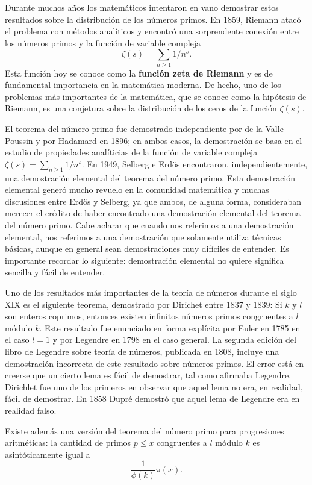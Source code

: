 Durante muchos años los matemáticos intentaron en vano demostrar estos
resultados sobre la distribución de los números primos.  En 1859, Riemann atacó
el problema con métodos analíticos y encontró una sorprendente conexión entre
los números primos y la función de variable compleja 
\[
\zeta(s)=\sum_{n\geq1}1/n^{s}. 
\]
Esta función hoy se conoce como la \textbf{función zeta de Riemann} y es de
fundamental importancia en la matemática moderna. De hecho, uno de los
problemas más importantes de la matemática, que se conoce como la hipótesis de
Riemann, es una conjetura sobre la distribución de los ceros de la función
$\zeta(s)$. 

El teorema del número primo fue demostrado independiente por de la Valle
Poussin y por Hadamard en 1896; en ambos casos, la demostración se basa en el
estudio de propiedades analíticias de la función de variable compleja
$\zeta(s)=\sum_{n\geq1}1/n^{s}$. En 1949, Selberg e Erd\"os encontraron,
independientemente, una demostración elemental del teorema del número primo.
Esta demostración elemental generó mucho revuelo en la comunidad matemática y
muchas discusiones entre Erd\"os y Selberg, ya que ambos, de alguna forma,
consideraban merecer el crédito de haber encontrado una demostración elemental
del teorema del número primo.  Cabe aclarar que cuando nos referimos a una
demostración elemental, nos referimos a una demostración que solamente utiliza
técnicas básicas, aunque en general sean demostraciones muy difíciles de
entender. Es importante recordar lo siguiente: demostración elemental no quiere
significa sencilla y fácil de entender. 

Uno de los resultados más importantes de la teoría de números durante el siglo
XIX es el siguiente teorema, demostrado por Dirichet entre 1837 y 1839: Si $k$
y $l$ son enteros coprimos, entonces existen infinitos números primos
congruentes a $l$ módulo $k$. 
Este resultado fue enunciado en forma explícita por Euler en 1785 en el caso
$l=1$ y por Legendre en 1798 en el caso general. La segunda edición del libro
de Legendre sobre teoría de números, publicada en 1808, incluye una
demostración incorrecta de este resultado sobre números primos. El error está
en creerse que un cierto lema es fácil de demostrar, tal como afirmaba
Legendre.  Dirichlet fue uno de los primeros en observar que aquel lema no era,
en realidad, fácil de demostrar. En 1858 Dupré demostró que aquel lema de
Legendre era en realidad falso.

Existe además una versión del teorema del número primo para progresiones
aritméticas: la cantidad de primos $p\leq x$ congruentes a $l$ módulo $k$ es
asintóticamente igual a 
\[
	\frac{1}{\phi(k)}\pi(x).
\]

